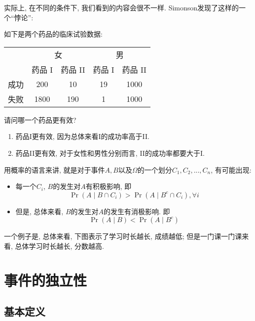 \documentclass{ctexart}
\begin{document}
实际上, 在不同的条件下, 我们看到的内容会很不一样. Simonson发现了这样的一个``悖论'':
\begin{example}[Simonson悖论]
    如下是两个药品的临床试验数据: 
    
    \begin{center}
       \begin{tabular}{c|c|c|c|c|} 
& \multicolumn{2}{|c|}{ 女 } & \multicolumn{2}{c|}{ 男 } \\
\cline { 2 - 5 } & 药品 I & 药品 II & 药品 I & 药品 II \\
\hline 成功 & 200 & 10 & 19 & 1000 \\
\hline 失败 & 1800 & 190 & 1 & 1000 \\
\hline
\end{tabular} 
    \end{center}
    请问哪一个药品更有效?
    \begin{enumerate}
        \item 药品I更有效, 因为总体来看I的成功率高于II.
        \item 药品II更有效, 对于女性和男性分别而言, II的成功率都要大于I.
    \end{enumerate}

    用概率的语言来讲, 就是对于事件$A, B$以及$\Omega$的一个划分$C_1, C_2, ..., C_n$, 有可能出现:
    \begin{itemize}
        \item 每一个$C_i$, $B$的发生对$A$有积极影响, 即$$
\operatorname{Pr}\left(A \mid B \cap C_i\right)>\operatorname{Pr}\left(A \mid B^c \cap C_i\right), \forall i
$$
\item 但是, 总体来看, $B$的发生对$A$的发生有消极影响. 即$$
\operatorname{Pr}(A \mid B)<\operatorname{Pr}\left(A \mid B^c\right)
$$
    \end{itemize}

一个例子是, 总体来看, 下图表示了学习时长越长, 成绩越低; 但是一门课一门课来看, 总体学习时长越长, 分数越高. 


\end{example}

\section{事件的独立性}

\subsection{基本定义}
\end{document}
